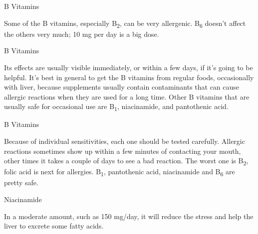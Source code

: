 \documentclass[11pt,oneside,openany,extrafontsizes]{memoir}
\begin{document}
\begin{standalonequote}{B Vitamins}

    \begin{answer}
        Some of the B vitamins, especially B\textsubscript{2}, can be very allergenic. B\textsubscript{6} doesn't affect the others very much; 10 mg per day is a big dose.
    \end{answer}
\end{standalonequote}

\begin{standalonequote}{B Vitamins}

    \begin{answer}
        Its effects are usually visible immediately, or within a few days, if it's going to be helpful. It's best in general to get the B vitamins from regular foods, occasionally with liver, because supplements usually contain contaminants that can cause allergic reactions when they are used for a long time. Other B vitamins that are usually safe for occasional use are B\textsubscript{1}, niacinamide, and pantothenic acid.
    \end{answer}
\end{standalonequote}

\begin{standalonequote}{B Vitamins}

    \begin{answer}
        Because of individual sensitivities, each one should be tested carefully. Allergic reactions sometimes show up within a few minutes of contacting your mouth, other times it takes a couple of days to see a bad reaction. The worst one is B\textsubscript{2}, folic acid is next for allergies. B\textsubscript{1}, pantothenic acid, niacinamide and B\textsubscript{6} are pretty safe.
    \end{answer}
\end{standalonequote}

\begin{standalonequote}{Niacinamide}

    \begin{answer}
        In a moderate amount, such as 150 mg/day, it will reduce the stress and help the liver to excrete some fatty acids.
    \end{answer}
\end{standalonequote}
\end{document}
